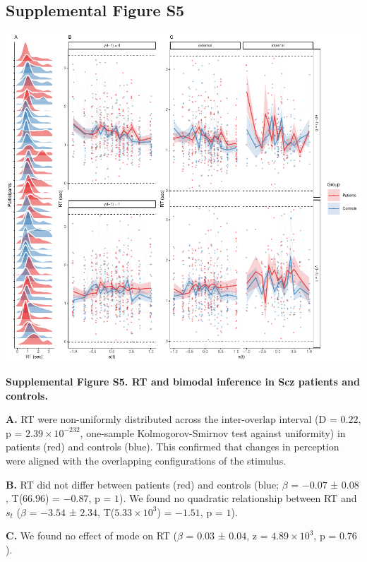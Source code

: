 \documentclass[
]{article}
\begin{document}
\newpage

\subsection{Supplemental Figure S5}\label{supplemental-figure-s5}

\includegraphics{modes_ketamine_scz_files/figure-latex/Supplemental_Figure_S5-1.pdf}

\textbf{Supplemental Figure S5. RT and bimodal inference in Scz patients
and controls.}

\textbf{A.} RT were non-uniformly distributed across the inter-overlap
interval (D = \(0.22\), p = \(\ensuremath{2.39\times 10^{-232}}\),
one-sample Kolmogorov-Smirnov test against uniformity) in patients (red)
and controls (blue). This confirmed that changes in perception were
aligned with the overlapping configurations of the stimulus.

\textbf{B.} RT did not differ between patients (red) and controls (blue;
\(\beta\) = \(-0.07\) ± \(0.08\), T(\(66.96\)) = \(-0.87\), p = \(1\)).
We found no quadratic relationship between RT and \(s_t\) (\(\beta\) =
\(-3.54\) ± \(2.34\), T(\(\ensuremath{5.33\times 10^{3}}\)) = \(-1.51\),
p = \(1\)).

\textbf{C.} We found no effect of mode on RT (\(\beta\) = \(0.03\) ±
\(0.04\), z = \(\ensuremath{4.89\times 10^{3}}\), p = \(0.76\)).

\newpage
\end{document}
